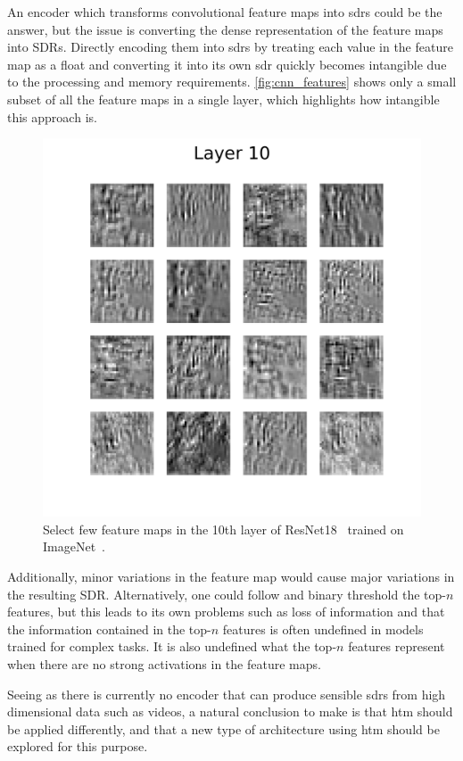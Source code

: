 \par
An encoder which transforms convolutional feature maps into \glspl*{sdr} could be the answer, but the issue is converting the dense representation of the feature maps into SDRs. Directly encoding them into \glspl*{sdr} by treating each value in the feature map as a float and converting it into its own \gls*{sdr} quickly becomes intangible due to the processing and memory requirements. \autoref{fig:cnn_features} shows only a small subset of all the feature maps in a single layer, which highlights how intangible this approach is.
\begin{figure}[H]
    \centering
    \includegraphics[width=0.5\linewidth]{resources/related_works/resnet18_layer_10.png}
    \caption[Feature Maps]{Select few feature maps in the 10th layer of ResNet18~\cite{resnet} trained on ImageNet~\cite{imagenet}.}
    \label{fig:cnn_features}
\end{figure}
\par
Additionally, minor variations in the feature map would cause major variations in the resulting SDR. Alternatively, one could follow \textcite{CNN_HTM} and binary threshold the top-$n$ features, but this leads to its own problems such as loss of information and that the information contained in the top-$n$ features is often undefined in models trained for complex tasks. It is also undefined what the top-$n$ features represent when there are no strong activations in the feature maps.
\par
Seeing as there is currently no encoder that can produce sensible \glspl*{sdr} from high dimensional data such as videos, a natural conclusion to make is that \gls*{htm} should be applied differently, and that a new type of architecture using \gls*{htm} should be explored for this purpose.
